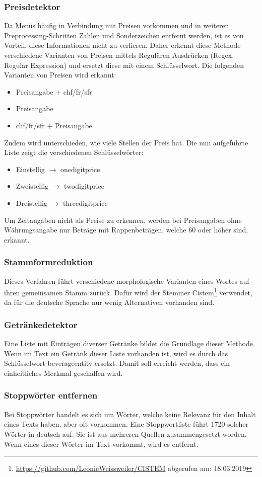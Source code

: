 \subsubsection{Preisdetektor}
Da Menüs häufig in Verbindung mit Preisen vorkommen und in weiteren Preprocessing-Schritten Zahlen und Sonderzeichen entfernt werden, ist es von Vorteil, diese Informationen nicht zu verlieren.
Daher erkennt diese Methode verschiedene Varianten von Preisen mittels Regulären Ausdrücken (Regex, Regular Expression) und ersetzt diese mit einem Schlüsselwort.
Die folgenden Varianten von Preisen wird erkannt:
\begin{itemize}
	\item Preisangabe + chf/fr/sfr
	\item Preisangabe
	\item chf/fr/sfr + Preisangabe
\end{itemize} 
Zudem wird unterschieden, wie viele Stellen der Preis hat.
Die nun aufgeführte Liste zeigt die verschiedenen Schlüsselwörter:
\begin{itemize}
	\item Einstellig $\rightarrow$ onedigitprice
	\item Zweistellig $\rightarrow$ twodigitprice
	\item Dreistellig $\rightarrow$ threedigitprice
\end{itemize} 
Um Zeitangaben nicht als Preise zu erkennen, werden bei Preisangaben ohne Währungsangabe nur Beträge mit Rappenbeträgen, welche 60 oder höher sind, erkannt.
\subsubsection{Stammformreduktion}
Dieses Verfahren führt verschiedene morphologische Varianten eines Wortes auf ihren gemeinsamen Stamm zurück.
Dafür wird der Stemmer \glqq Cistem\footnote{\url{https://github.com/LeonieWeissweiler/CISTEM} abgerufen am: 18.03.2019}\grqq{} verwendet, da für die deutsche Sprache nur wenig Alternativen vorhanden sind. 
\subsubsection{Getränkedetektor}
Eine Liste mit Einträgen diverser Getränke bildet die Grundlage dieser Methode.
Wenn im Text ein Getränk dieser Liste vorhanden ist, wird es durch das Schlüsselwort \glqq beverageentity\grqq{} ersetzt.
Damit soll erreicht werden, dass ein einheitliches Merkmal geschaffen wird.
\subsubsection{Stoppwörter entfernen}
Bei Stoppwörter handelt es sich um Wörter, welche keine Relevanz für den Inhalt eines Texts haben, aber oft vorkommen.
Eine Stoppwortliste führt 1720 solcher Wörter in deutsch auf. Sie ist aus mehreren Quellen zusammengesetzt worden.
Wenn eines dieser Wörter im Text vorkommt, wird es entfernt.
